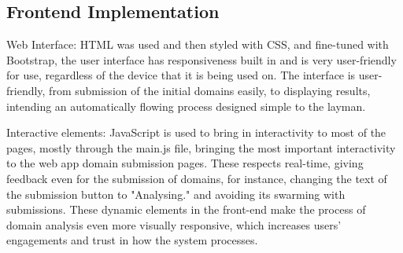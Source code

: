 \subsection{Frontend Implementation}

Web Interface: HTML was used and then styled with CSS, and fine-tuned with Bootstrap, the user interface has responsiveness built in and is very user-friendly for use, regardless of the device that it is being used on. The interface is user-friendly, from submission of the initial domains easily, to displaying results, intending an automatically flowing process designed simple to the layman.


Interactive elements: JavaScript is used to bring in interactivity to most of the pages, mostly through the main.js file, bringing the most important interactivity to the web app domain submission pages. These respects real-time, giving feedback even for the submission of domains, for instance, changing the text of the submission button to "Analysing." and avoiding its swarming with submissions. These dynamic elements in the front-end make the process of domain analysis even more visually responsive, which increases users' engagements and trust in how the system processes.

